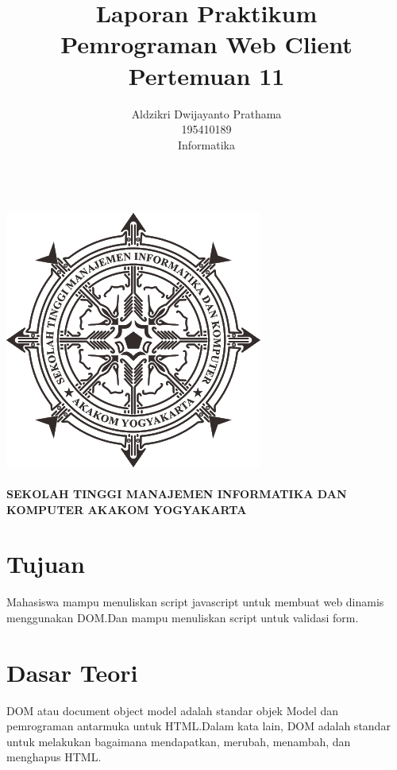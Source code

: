 \documentclass[a4paper,12pt]{article}
\begin{document}
\title{ {\Large Laporan Praktikum}\\ Pemrograman Web Client\\{\Large Pertemuan 11}}

\author{Aldzikri Dwijayanto Prathama 
	\\195410189
	\\Informatika}
\makeatletter
\begin{titlepage}
	\begin{center}
		{\huge \bfseries \@title }\\[14ex]
		\includegraphics[scale=.8]{logo}\\[4ex]
		{\large \@author}\\[12ex]
		{\large \bfseries {SEKOLAH TINGGI MANAJEMEN INFORMATIKA DAN KOMPUTER
				AKAKOM YOGYAKARTA}}
	\end{center}


\end{titlepage}
\makeatother
\renewcommand{\figurename}{Gambar}
\newpage
\tableofcontents
\newpage
\section{Tujuan}
Mahasiswa mampu menuliskan script javascript untuk membuat web dinamis menggunakan DOM.\@ Dan mampu menuliskan script untuk validasi form.
\section{Dasar Teori}

DOM atau document object model adalah standar objek Model dan pemrograman antarmuka untuk HTML.\@ Dalam kata lain, DOM
adalah standar untuk melakukan bagaimana mendapatkan, merubah, menambah, dan menghapus HTML.\@\\
\end{document}

